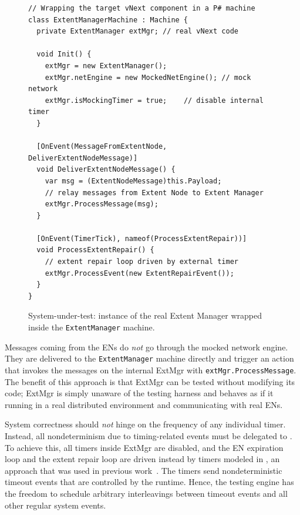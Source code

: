 \begin{figure}[t]
\begin{lstlisting}
// Wrapping the target vNext component in a P# machine
class ExtentManagerMachine : Machine {
  private ExtentManager extMgr; // real vNext code

  void Init() {
    extMgr = new ExtentManager();
    extMgr.netEngine = new MockedNetEngine(); // mock network
    extMgr.isMockingTimer = true;	 // disable internal timer
  }

  [OnEvent(MessageFromExtentNode, DeliverExtentNodeMessage)]
  void DeliverExtentNodeMessage() {
    var msg = (ExtentNodeMessage)this.Payload;
    // relay messages from Extent Node to Extent Manager
    extMgr.ProcessMessage(msg);
  }
	
  [OnEvent(TimerTick), nameof(ProcessExtentRepair))]
  void ProcessExtentRepair() {
    // extent repair loop driven by external timer
    extMgr.ProcessEvent(new ExtentRepairEvent());
  }
}
\end{lstlisting}
\vspace{-2mm}
\caption{System-under-test: instance of the real Extent Manager wrapped inside the \texttt{ExtentManager} machine.}
\label{fig:wrap_target}
\end{figure}

Messages coming from the ENs do \emph{not} go through the mocked network engine. They are delivered to the \texttt{ExtentManager} machine directly and trigger an action that invokes the messages on the internal ExtMgr with \texttt{extMgr.ProcessMessage}. The benefit of this approach is that ExtMgr can be tested without modifying its code; ExtMgr is simply unaware of the testing harness and behaves as if it running in a real distributed environment and communicating with real ENs.

System correctness should \emph{not} hinge on the frequency of any individual timer. Instead, all nondeterminism due to timing-related events must be delegated to \psharp. To achieve this, all timers inside ExtMgr are disabled, and the EN expiration loop and the extent repair loop are driven instead by timers modeled in \psharp, an approach that was used in previous work~\cite{desai2015building}. The \psharp timers send nondeterministic timeout events that are controlled by the \psharp runtime. Hence, the \psharp testing engine has the freedom to schedule arbitrary interleavings between timeout events and all other regular system events.

